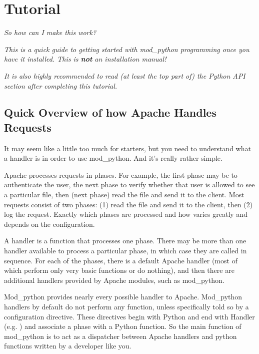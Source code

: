 \chapter{Tutorial\label{tutorial}}

\begin{flushright}
\emph{So how can I make this work?}
\end{flushright}

\emph{This is a quick guide to getting started with mod_python programming once you have it installed. This is \textbf{not} an installation manual!}

\emph{It is also highly recommended to read (at least the top part of) the
Python API section after completing this tutorial.}

\section{Quick Overview of how Apache Handles Requests\label{tut-overview}}

It may seem like a little too much for starters, but you need to
understand what a handler is in order to use mod_python. And it's
really rather simple.

Apache processes requests in phases. For example, the first phase may
be to authenticate the user, the next phase to verify whether that
user is allowed to see a particular file, then (next phase) read the
file and send it to the client. Most requests consist of two phases:
(1) read the file and send it to the client, then (2) log the
request. Exactly which phases are processed and how varies greatly and
depends on the configuration.

A handler is a function that processes one phase. There may be more
than one handler available to process a particular phase, in which
case they are called in sequence. For each of the phases, there is a
default Apache handler (most of which perform only very basic
functions or do nothing), and then there are additional handlers
provided by Apache modules, such as mod_python.

Mod_python provides nearly every possible handler to
Apache. Mod_python handlers by default do not perform any function,
unless specifically told so by a configuration directive. These
directives begin with Python and end with Handler
(e.g. ) and associate a phase with a Python
function. So the main function of mod_python is to act as a dispatcher
between Apache handlers and python functions written by a developer
like you.

